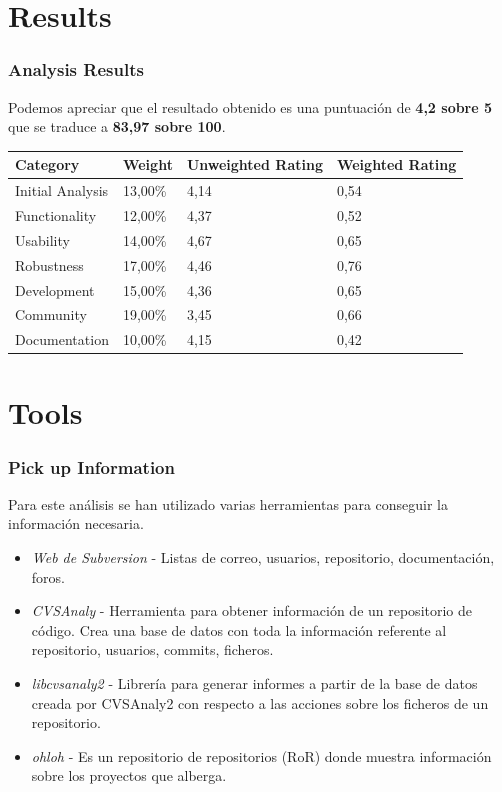\documentclass[xcolor=dvipsnames]{beamer}
\begin{document}
\section{Results}
\begin{frame}[allowframebreaks]
\frametitle{Analysis Results}

Podemos apreciar que el resultado obtenido es una puntuaci\'on de \textbf{4,2 sobre 5} que se traduce a \textbf{83,97 sobre 100}.

\begin{tabular}{|l|l|l|l|}
    \hline {\bf Category} & {\bf Weight} & {\bf Unweighted Rating} & {\bf Weighted Rating}\\
    \hline Initial Analysis	 & 13,00\% & 4,14 & 0,54 \\
    \hline Functionality & 12,00\% & 4,37 & 0,52\\
    \hline Usability & 14,00\% & 4,67 & 0,65\\
    \hline Robustness & 17,00\% & 4,46 & 0,76\\
    \hline Development & 15,00\% & 4,36 & 0,65\\
    \hline Community & 19,00\% & 3,45 & 0,66\\
    \hline Documentation & 10,00\% & 4,15 & 0,42\\
    \hline
\end{tabular}

\end{frame}

\section{Tools}
\begin{frame}[allowframebreaks]
\frametitle{Pick up Information}

\par Para este an\'alisis se han utilizado varias herramientas para conseguir la informaci\'on necesaria.

\begin{itemize}
    \item \emph{Web de Subversion} - Listas de correo, usuarios, repositorio, documentaci\'on, foros.
    \item \emph{CVSAnaly} - Herramienta para obtener informaci\'on de un repositorio de c\'odigo. Crea una base de datos con toda la informaci\'on referente al repositorio, usuarios, commits, ficheros.
    \item \emph{libcvsanaly2} - Librer\'ia para generar informes a partir de la base de datos creada por CVSAnaly2 con respecto a las acciones sobre los ficheros de un repositorio.
    \item \emph{ohloh} - Es un repositorio de repositorios (RoR) donde muestra informaci\'on sobre los proyectos que alberga.

\end{itemize}

\end{frame}
\end{document}
